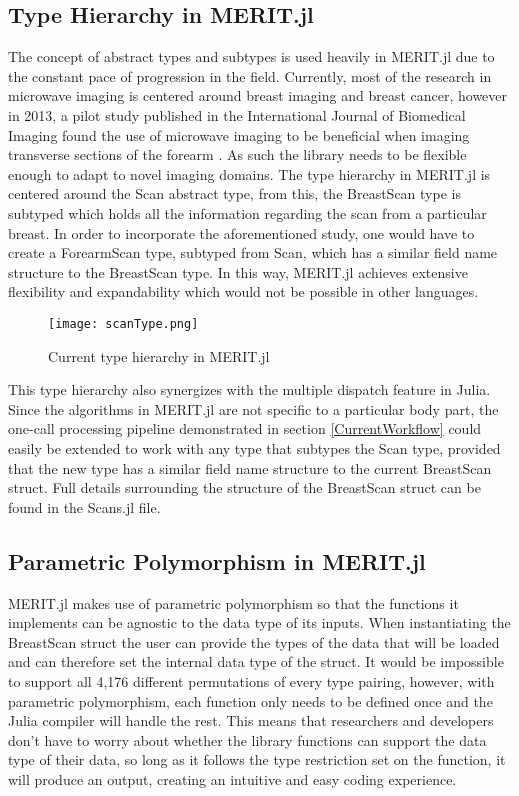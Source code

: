 \subsection{Type Hierarchy in MERIT.jl}
The concept of abstract types and subtypes is used heavily in MERIT.jl due to the constant pace of progression in the
field. Currently, most of the research in microwave imaging is centered around breast imaging and breast cancer, however
in 2013, a pilot study published in the International Journal of Biomedical Imaging found the use of microwave imaging
to be beneficial when imaging transverse sections of the forearm \cite{gilmoreMicrowaveImagingHuman2013}. As such the
library needs to be flexible enough to adapt to novel imaging domains. The type hierarchy in MERIT.jl is centered around
the Scan abstract type, from this, the BreastScan type is subtyped which holds all the information regarding the scan
from a particular breast. In order to incorporate the aforementioned study, one would have to create a ForearmScan type,
subtyped from Scan, which has a similar field name structure to the BreastScan type. In this way, MERIT.jl achieves
extensive flexibility and expandability which would not be possible in other languages.
\begin{figure}[h!]
    \texttt{[image: scanType.png]}
    \centering
    \caption{Current type hierarchy in MERIT.jl} 
    \label{fig:scanType}
\end{figure}
\FloatBarrier
This type hierarchy also synergizes with the multiple dispatch feature in Julia. Since the algorithms in MERIT.jl are
not specific to a particular body part, the one-call processing pipeline demonstrated in section \ref{CurrentWorkflow}
could easily be extended to work with any type that subtypes the Scan type, provided that the new type has a similar
field name structure to the current BreastScan struct. Full details surrounding the structure of the BreastScan struct
can be found in the Scans.jl file.

\subsection{Parametric Polymorphism in MERIT.jl}
MERIT.jl makes use of parametric polymorphism so that the functions it implements can be agnostic to the data type of
its inputs. When instantiating the BreastScan struct the user can provide the types of the data that will be loaded and
can therefore set the internal data type of the struct. It would be impossible to support all 4,176 different
permutations of every type pairing, however, with parametric polymorphism, each function only needs to be defined once
and the Julia compiler will handle the rest. This means that researchers and developers don't have to worry about
whether the library functions can support the data type of their data, so long as it follows the type restriction set on
the function, it will produce an output, creating an intuitive and easy coding experience. 

